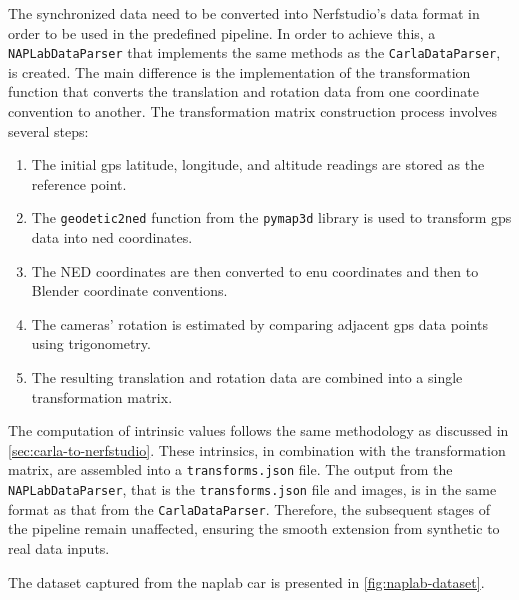 The synchronized data need to be converted into Nerfstudio's data format in order to be used in the predefined pipeline. In order to achieve this, a \texttt{NAPLabDataParser} that implements the same methods as the \texttt{CarlaDataParser}, is created. The main difference is the implementation of the transformation function that converts the translation and rotation data from one coordinate convention to another. The transformation matrix construction process involves several steps:

\begin{enumerate}
    \item The initial \acrshort{gps} latitude, longitude, and altitude readings are stored as the reference point.
    \item The \texttt{geodetic2ned} function from the \texttt{pymap3d} library \cite{Hirsch_PyGemini} is used to transform \acrshort{gps} data into \acrfull{ned} coordinates.
    \item The NED coordinates are then converted to \acrfull{enu} coordinates and then to Blender coordinate conventions.
    \item The cameras' rotation is estimated by comparing adjacent \acrshort{gps} data points using trigonometry.
    \item The resulting translation and rotation data are combined into a single transformation matrix.
\end{enumerate}

The computation of intrinsic values follows the same methodology as discussed in \autoref{sec:carla-to-nerfstudio}. These intrinsics, in combination with the transformation matrix, are assembled into a \texttt{transforms.json} file. The output from the \texttt{NAPLabDataParser}, that is the \texttt{transforms.json} file and images, is in the same format as that from the \texttt{CarlaDataParser}. Therefore, the subsequent stages of the pipeline remain unaffected, ensuring the smooth extension from synthetic to real data inputs.

The dataset captured from the \acrshort{naplab} car is presented in \autoref{fig:naplab-dataset}.







